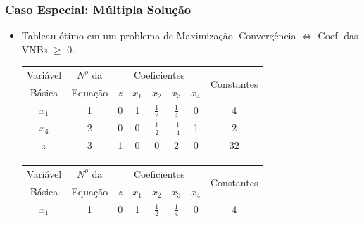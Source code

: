 \documentclass{beamer}
\begin{document}
\begin{frame}
	\frametitle{Caso Especial: Múltipla Solução}

	\begin{itemize}
		\item {Tableau ótimo em um problema de Maximização. Convergência $\Leftrightarrow$ Coef. das VNBs $\ge$ 0.}
			\only<1>
			{
			\begin{table}
				\scriptsize
				\newcommand{\azbr}{\cellcolor{blue!70} \color{white}}
				\newcommand{\azvm}{\cellcolor{blue!70} \color{red}}
				\newcommand{\ampr}{\cellcolor{yellow!70} \color{black}}
				\newcommand{\amvm}{\cellcolor{yellow!70} \color{red}}
				\begin{tabular}{ c  c  c  c  c  c  c  c }
				\azbr Variável & \azbr $N^o$ da & \multicolumn{5}{c}{\azbr Coeficientes} & \multirow{2}{1.5cm}{\azbr  Constantes} \\[3pt]
				\azbr Básica   & \azbr Equação  & \azbr $z$ &\azvm  $x_1$ & \azbr $x_2$ & \azbr $x_3$ & \azvm $x_4$ &  \azbr                               \\[3pt]
				\amvm $x_1$ & \ampr 1 & \ampr 0 & \ampr 1 & \ampr $\frac{1}{2}$ & \ampr $\frac{1}{4}$  &  \ampr 0 & \ampr 4  \\ [3pt]
				\amvm $x_4$ & \ampr 2 & \ampr 0 & \ampr 0 & \ampr $\frac{1}{2}$ & \ampr -$\frac{1}{4}$ &  \ampr 1 & \ampr 2  \\	[3pt]
				\ampr $z$   & \ampr 3 & \ampr 1 & \ampr 0 & \ampr 0  			& \ampr 2 			   &  \ampr 0 & \ampr 32 \\	[3pt]
				\end{tabular}
			\end{table}
			}
			\only<2->
			{
			\begin{table}
				\scriptsize
				\newcommand{\azbr}{\cellcolor{blue!70} \color{white}}
				\newcommand{\azvm}{\cellcolor{blue!70} \color{red}}
				\newcommand{\ampr}{\cellcolor{yellow!70} \color{black}}
				\newcommand{\amvm}{\cellcolor{yellow!70} \color{red}}
				\newcommand{\vevm}{\cellcolor{green!70} \color{red}}
				\begin{tabular}{ c  c  c  c  c  c  c  c }
				\azbr Variável & \azbr $N^o$ da & \multicolumn{5}{c}{\azbr Coeficientes} & \multirow{2}{1.5cm}{\azbr  Constantes} \\[3pt]
				\azbr Básica   & \azbr Equação  & \azbr $z$ &\azvm  $x_1$ & \azbr $x_2$ & \azbr $x_3$ & \azvm $x_4$ &  \azbr                               \\[3pt]
				\amvm $x_1$ & \ampr 1 & \ampr 0 & \ampr 1 & \ampr $\frac{1}{2}$ & \ampr $\frac{1}{4}$  &  \ampr 0 & \ampr 4  \\ [3pt]

\end{tabular}
\end{table}}
\end{itemize}
\end{frame}
\end{document}
